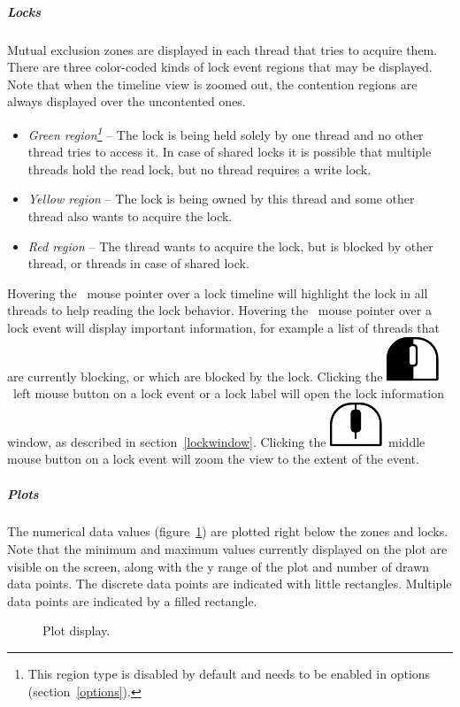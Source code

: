 \documentclass[hidelinks,titlepage,a4paper]{article}
\newcommand{\LMB}{\includegraphics[height=.8\baselineskip]{icons/lmb}}
\newcommand{\MMB}{\includegraphics[height=.8\baselineskip]{icons/mmb}}
\begin{document}
\subparagraph{Locks}

Mutual exclusion zones are displayed in each thread that tries to acquire them. There are three color-coded kinds of lock event regions that may be displayed. Note that when the timeline view is zoomed out, the contention regions are always displayed over the uncontented ones.

\begin{itemize}
\item \emph{Green region\footnote{This region type is disabled by default and needs to be enabled in options (section~\ref{options}).}} -- The lock is being held solely by one thread and no other thread tries to access it. In case of shared locks it is possible that multiple threads hold the read lock, but no thread requires a write lock.
\item \emph{Yellow region} -- The lock is being owned by this thread and some other thread also wants to acquire the lock.
\item \emph{Red region} -- The thread wants to acquire the lock, but is blocked by other thread, or threads in case of shared lock.
\end{itemize}

Hovering the \faMousePointer{}~mouse pointer over a lock timeline will highlight the lock in all threads to help reading the lock behavior. Hovering the \faMousePointer{}~mouse pointer over a lock event will display important information, for example a list of threads that are currently blocking, or which are blocked by the lock. Clicking the \LMB{}~left mouse button on a lock event or a lock label will open the lock information window, as described in section~\ref{lockwindow}. Clicking the \MMB{}~middle mouse button on a lock event will zoom the view to the extent of the event.

\subparagraph{Plots}
\label{plots}

The numerical data values (figure~\ref{plot}) are plotted right below the zones and locks. Note that the minimum and maximum values currently displayed on the plot are visible on the screen, along with the y range of the plot and number of drawn data points. The discrete data points are indicated with little rectangles. Multiple data points are indicated by a filled rectangle.

\begin{figure}[h]
\centering{}
\caption{Plot display.}
\label{plot}
\end{figure}
\end{document}

